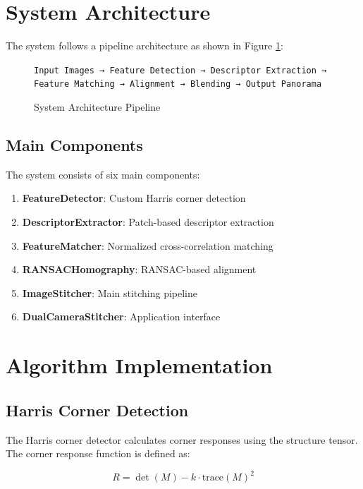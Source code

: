 \documentclass[12pt,a4paper]{article}
\begin{document}
\section{System Architecture}

The system follows a pipeline architecture as shown in Figure \ref{fig:architecture}:

\begin{figure}[h]
\centering
\texttt{Input Images → Feature Detection → Descriptor Extraction → Feature Matching → Alignment → Blending → Output Panorama}
\caption{System Architecture Pipeline}
\label{fig:architecture}
\end{figure}

\subsection{Main Components}

The system consists of six main components:

\begin{enumerate}
    \item \textbf{FeatureDetector}: Custom Harris corner detection
    \item \textbf{DescriptorExtractor}: Patch-based descriptor extraction
    \item \textbf{FeatureMatcher}: Normalized cross-correlation matching
    \item \textbf{RANSACHomography}: RANSAC-based alignment
    \item \textbf{ImageStitcher}: Main stitching pipeline
    \item \textbf{DualCameraStitcher}: Application interface
\end{enumerate}

\section{Algorithm Implementation}

\subsection{Harris Corner Detection}

The Harris corner detector calculates corner responses using the structure tensor. The corner response function is defined as:

\begin{equation}
R = \det(M) - k \cdot \text{trace}(M)^2
\end{equation}
\end{document}
